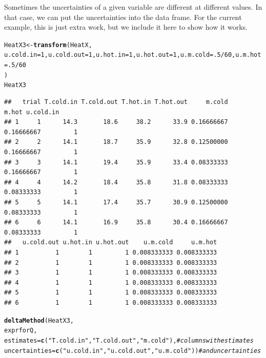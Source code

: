 \documentclass[twoside]{book}\usepackage[]{graphicx}\usepackage[]{xcolor}
\makeatletter
\newcommand{\hlnum}[1]{\textcolor[rgb]{0.686,0.059,0.569}{#1}}%
\newcommand{\hlstr}[1]{\textcolor[rgb]{0.192,0.494,0.8}{#1}}%
\newcommand{\hlcom}[1]{\textcolor[rgb]{0.678,0.584,0.686}{\textit{#1}}}%
\newcommand{\hlopt}[1]{\textcolor[rgb]{0,0,0}{#1}}%
\newcommand{\hlstd}[1]{\textcolor[rgb]{0.345,0.345,0.345}{#1}}%
\newcommand{\hlkwb}[1]{\textcolor[rgb]{0.69,0.353,0.396}{#1}}%
\newcommand{\hlkwc}[1]{\textcolor[rgb]{0.333,0.667,0.333}{#1}}%
\newcommand{\hlkwd}[1]{\textcolor[rgb]{0.737,0.353,0.396}{\textbf{#1}}}%
\newenvironment{kframe}{%
 \def\at@end@of@kframe{}%
 \ifinner\ifhmode%
  \def\at@end@of@kframe{\end{minipage}}%
  \begin{minipage}{\columnwidth}%
 \fi\fi%
 \def\FrameCommand##1{\hskip\@totalleftmargin \hskip-\fboxsep
 \colorbox{shadecolor}{##1}\hskip-\fboxsep
     \hskip-\linewidth \hskip-\@totalleftmargin \hskip\columnwidth}%
 \MakeFramed {\advance\hsize-\width
   \@totalleftmargin\z@ \linewidth\hsize
   \@setminipage}}%
 {\par\unskip\endMakeFramed%
 \at@end@of@kframe}
\newenvironment{knitrout}{}{} %
\newcounter{example}[section]
\makeatother
\begin{document}
Sometimes the uncertainties of a given variable are different at different values.
In that case, we can put the uncertainties into the data frame.  For the current 
example, this is just extra work, but we include it here to show how it works.
\begin{knitrout}
\color{fgcolor}\begin{kframe}
\begin{alltt}
\hlstd{HeatX3} \hlkwb{<-} \hlkwd{transform}\hlstd{(HeatX,}
  \hlkwc{u.cold.in}\hlstd{=}\hlnum{1}\hlstd{,} \hlkwc{u.cold.out}\hlstd{=}\hlnum{1}\hlstd{,} \hlkwc{u.hot.in}\hlstd{=}\hlnum{1}\hlstd{,} \hlkwc{u.hot.out}\hlstd{=}\hlnum{1}\hlstd{,} \hlkwc{u.m.cold}\hlstd{=}\hlnum{.5}\hlopt{/}\hlnum{60}\hlstd{,} \hlkwc{u.m.hot}\hlstd{=}\hlnum{.5}\hlopt{/}\hlnum{60}
\hlstd{)}
\hlstd{HeatX3}
\end{alltt}
\begin{verbatim}
##   trial T.cold.in T.cold.out T.hot.in T.hot.out     m.cold      m.hot u.cold.in
## 1     1      14.3       18.6     38.2      33.9 0.16666667 0.16666667         1
## 2     2      14.1       18.7     35.9      32.8 0.12500000 0.16666667         1
## 3     3      14.1       19.4     35.9      33.4 0.08333333 0.16666667         1
## 4     4      14.2       18.4     35.8      31.8 0.08333333 0.08333333         1
## 5     5      14.1       17.4     35.7      30.9 0.12500000 0.08333333         1
## 6     6      14.1       16.9     35.8      30.4 0.16666667 0.08333333         1
##   u.cold.out u.hot.in u.hot.out    u.m.cold     u.m.hot
## 1          1        1         1 0.008333333 0.008333333
## 2          1        1         1 0.008333333 0.008333333
## 3          1        1         1 0.008333333 0.008333333
## 4          1        1         1 0.008333333 0.008333333
## 5          1        1         1 0.008333333 0.008333333
## 6          1        1         1 0.008333333 0.008333333
\end{verbatim}
\begin{alltt}
\hlkwd{deltaMethod}\hlstd{( HeatX3,}
  \hlstd{exprforQ,}
  \hlkwc{estimates} \hlstd{=} \hlkwd{c}\hlstd{(}\hlstr{"T.cold.in"}\hlstd{,}\hlstr{"T.cold.out"}\hlstd{,}\hlstr{"m.cold"}\hlstd{),}      \hlcom{# columns with estimates}
  \hlkwc{uncertainties} \hlstd{=} \hlkwd{c}\hlstd{(}\hlstr{"u.cold.in"}\hlstd{,} \hlstr{"u.cold.out"}\hlstd{,} \hlstr{"u.m.cold"}\hlstd{))}   \hlcom{# and uncertainties}
\end{alltt}



\end{kframe}
\end{knitrout}
\end{document}
